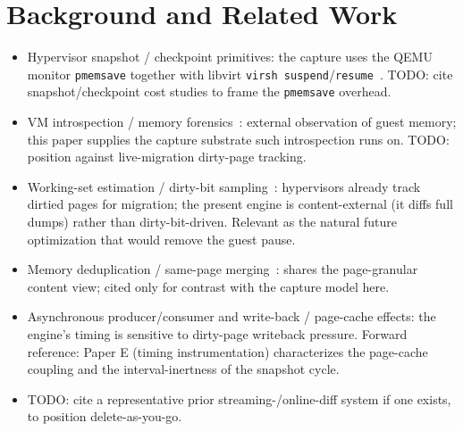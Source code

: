 \documentclass[conference]{IEEEtran}
\begin{document}
\section{Background and Related Work}
\begin{itemize}
  \item Hypervisor snapshot / checkpoint primitives: the capture uses the QEMU
        monitor \texttt{pmemsave} together with libvirt \texttt{virsh
        suspend}/\texttt{resume}~\cite{TODO_libvirt_pmemsave}. TODO: cite
        snapshot/checkpoint cost studies to frame the \texttt{pmemsave}
        overhead.
  \item VM introspection / memory forensics~\cite{garfinkel2003vmi}: external
        observation of guest memory; this paper supplies the capture substrate
        such introspection runs on. TODO: position against live-migration
        dirty-page tracking.
  \item Working-set estimation / dirty-bit sampling~\cite{TODO_working_set_estimation}:
        hypervisors already track dirtied pages for migration; the present
        engine is content-external (it diffs full dumps) rather than
        dirty-bit-driven. Relevant as the natural future optimization that
        would remove the guest pause.
  \item Memory deduplication / same-page merging~\cite{TODO_ksm_dedup}: shares
        the page-granular content view; cited only for contrast with the
        capture model here.
  \item Asynchronous producer/consumer and write-back / page-cache effects:
        the engine's timing is sensitive to dirty-page writeback pressure.
        Forward reference: Paper E (timing instrumentation) characterizes the
        page-cache coupling and the interval-inertness of the snapshot cycle.
  \item TODO: cite a representative prior streaming-/online-diff system if one
        exists, to position delete-as-you-go.
\end{itemize}

\end{document}
